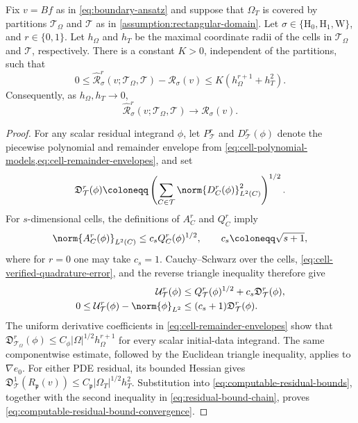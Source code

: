 \begin{theorem}
\label{thm:computable-residual-bound-convergence}
Fix
$v=Bf$ as in \eqref{eq:boundary-ansatz} and suppose that $\Omega_T$ is covered by partitions $\mathcal T_\Omega$ and $\mathcal T$ as in \cref{assumption:rectangular-domain}.  Let
$\sigma\in\{\mathrm H_0,\mathrm H_1,\mathrm W\}$, and $r\in\{0,1\}$.
Let $h_\Omega$ and $h_T$ be the maximal coordinate radii
of the cells in $\mathcal T_\Omega$ and $\mathcal T$, respectively.  There
is a constant $K>0$, independent of the partitions, such that
\begin{equation}\label{eq:computable-residual-bound-convergence}
    0\leq
    \widehat{\mathcal R}_{\sigma}^r
    (v;\mathcal T_\Omega,\mathcal T)-\mathcal R_{\sigma}(v)
    \leq K\left(h_\Omega^{r+1}+h_T^2\right).
\end{equation}
Consequently, as $h_\Omega,h_T\to0$,
\[
    \widehat{\mathcal R}_{\sigma}^r
    (v;\mathcal T_\Omega,\mathcal T)
    \longrightarrow \mathcal R_{\sigma}(v).
\]
\end{theorem}

\begin{proof}
For any scalar residual integrand $\phi$, let $P_{\mathcal T}^r$ and
$D_{\mathcal T}^r(\phi)$ denote the piecewise polynomial and remainder
envelope from \cref{eq:cell-polynomial-models,eq:cell-remainder-envelopes},
and set
\[
    \mathfrak D_{\mathcal T}^r(\phi)
    \coloneqq
    \left(\sum_{C\in\mathcal T}
    \norm{D_C^r(\phi)}_{L^2(C)}^2\right)^{1/2}.
\]
For $s$-dimensional cells, the definitions of $A_C^r$ and $Q_C^r$ imply
\[
 \norm{A_C^r(\phi)}_{L^2(C)}
 \leq c_s Q_C^r(\phi)^{1/2},
 \qquad c_s\coloneqq\sqrt{s+1},
\]
where for $r=0$ one may take $c_s=1$.  Cauchy--Schwarz over the cells,
\eqref{eq:cell-verified-quadrature-error}, and the reverse triangle
inequality therefore give
\[
 \begin{aligned}
  \mathcal U_{\mathcal T}^r(\phi)
  &\leq Q_{\mathcal T}^r(\phi)^{1/2}
  +c_s\mathfrak D_{\mathcal T}^r(\phi),\\
  0\leq\mathcal U_{\mathcal T}^r(\phi)-\norm{\phi}_{L^2}
  &\leq(c_s+1)\mathfrak D_{\mathcal T}^r(\phi).
 \end{aligned}
\]
The uniform derivative coefficients in
\eqref{eq:cell-remainder-envelopes} show that
$\mathfrak D_{\mathcal T_\Omega}^r(\phi)
\leq C_\phi|\Omega|^{1/2}h_\Omega^{r+1}$ for every scalar initial-data
integrand.  The same componentwise estimate, followed by the Euclidean
triangle inequality, applies to $\nabla e_0$.  For either PDE residual, its
bounded Hessian gives
$\mathfrak D_{\mathcal T}^1(R_{\mathfrak p}(v))
\leq C_{\mathfrak p}|\Omega_T|^{1/2}h_T^2$.
Substitution into \eqref{eq:computable-residual-bounds}, together with the
second inequality in \eqref{eq:residual-bound-chain}, proves
\eqref{eq:computable-residual-bound-convergence}.
\end{proof}


